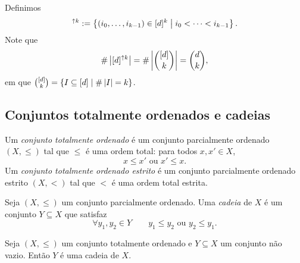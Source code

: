 Definimos
	\begin{equation*}
	[d]^{\uparrow k} := \set{(i_0,\ldots,i_{k-1}) \in [d]^k}{i_{0}<\cdots<i_{k-1}}.
	\end{equation*}
Note que
	\begin{equation*}
	\#\left\lvert{[d]^{\uparrow k}}\right\rvert = \#\left\lvert{\binom{[d]}{k}}\right\rvert = \binom{d}{k},
	\end{equation*}
em que $\binom{[d]}{k} = \left\{{I \subseteq [d]}\;\middle\vert\;{\#\left\lvert{I}\right\rvert=k}\right\}$.



\subsection{Conjuntos totalmente ordenados e cadeias}

\begin{definition}
	Um \emph{conjunto totalmente ordenado} é um conjunto parcialmente ordenado $(X,\leq)$ tal que $\leq$ é uma ordem total: para todos $x,x' \in X$,
		\begin{equation*}
			x \leq x' \text{\ \ ou\ \ } x' \leq x.
		\end{equation*}
	Um \emph{conjunto totalmente ordenado estrito} é um conjunto parcialmente ordenado estrito $(X,<)$ tal que $<$ é uma ordem total estrita.
\end{definition}

\begin{definition}
	Seja $(X,\leq)$ um conjunto parcialmente ordenado. Uma \emph{cadeia} de $X$ é um conjunto $Y \subseteq X$ que satisfaz
	\begin{equation*}
	\forall y_1,y_2 \in Y \qquad y_1 \leq y_2 \text{\ \ ou\ \ } y_2 \leq y_1.
	\end{equation*}
\end{definition}

\begin{exercise}
	Seja $(X,\leq)$ um conjunto totalmente ordenado e $Y \subseteq X$ um conjunto não vazio. Então $Y$ é uma cadeia de $X$.
\end{exercise}

